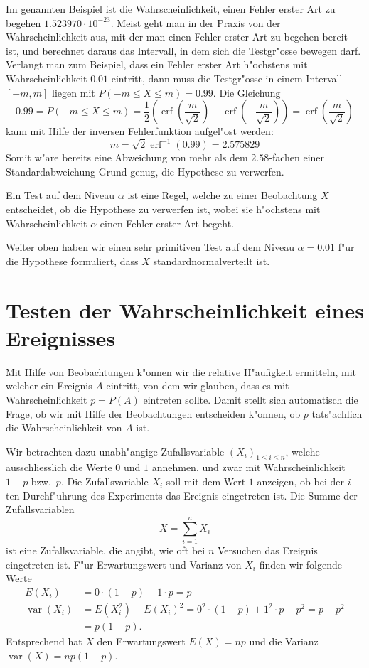 Im genannten Beispiel ist die Wahrscheinlichkeit, einen Fehler erster
Art zu begehen $1.523970\cdot 10^{-23}$.
Meist geht man in der Praxis von der
Wahrscheinlichkeit aus, mit der man einen Fehler erster Art zu begehen
bereit ist, und berechnet daraus das Intervall, in dem sich die
Testgr"osse bewegen darf.
Verlangt man zum Beispiel, dass ein Fehler erster
Art h"ochstens mit Wahrscheinlichkeit $0.01$ eintritt, dann muss die 
Testgr"osse in einem Intervall $[-m,m]$ liegen mit $P(-m\le X\le m)=0.99$.
Die Gleichung
\[
0.99 = P(-m\le X\le m)
=\frac12\left(\operatorname{erf}(\frac{m}{\sqrt{2}})-\operatorname{erf}(-\frac{m}{\sqrt{2}})\right)
=\operatorname{erf}(\frac{m}{\sqrt{2}})
\]
kann mit Hilfe der inversen Fehlerfunktion aufgel"ost werden:
\[
m=\sqrt{2}\operatorname{erf}^{-1}(0.99)=2.575829
\]
Somit w"are bereits eine Abweichung von mehr als dem $2.58$-fachen einer
Standardabweichung Grund genug, die Hypothese zu verwerfen.

\begin{definition}
Ein Test auf dem Niveau $\alpha$ ist eine Regel, welche zu einer
Beobachtung $X$ entscheidet, ob die Hypothese zu verwerfen ist, wobei
sie h"ochstens mit Wahrscheinlichkeit $\alpha$ einen Fehler erster
Art begeht.
\end{definition}

Weiter oben haben wir einen sehr primitiven Test auf dem Niveau
$\alpha=0.01$ f"ur die
Hypothese formuliert, dass $X$ standardnormalverteilt ist.

\section{Testen der Wahrscheinlichkeit eines Ereignisses}
Mit Hilfe von Beobachtungen k"onnen wir die relative H"aufigkeit ermitteln, mit
welcher ein Ereignis $A$ eintritt, von dem wir glauben, dass es mit
Wahrscheinlichkeit $p=P(A)$ eintreten sollte.
Damit stellt sich automatisch die Frage, ob wir mit Hilfe der
Beobachtungen entscheiden k"onnen, ob $p$ tats"achlich die Wahrscheinlichkeit
von $A$ ist.

Wir betrachten dazu unabh"angige Zufallsvariable $(X_i)_{1\le i\le n}$,
welche ausschliesslich
die Werte $0$ und $1$ annehmen, und zwar mit Wahrscheinlichkeit
$1-p$ bzw.~$p$.
Die Zufallsvariable $X_i$ soll mit dem Wert $1$ anzeigen,
ob bei der $i$-ten Durchf"uhrung des Experiments das Ereignis eingetreten ist.
Die Summe der Zufallsvariablen 
\[
X=\sum_{i=1}^nX_i
\]
ist eine Zufallsvariable, die angibt, wie oft bei $n$ Versuchen das Ereignis
eingetreten ist.
F"ur Erwartungswert und Varianz von $X_i$ finden
wir folgende Werte
\begin{align*}
E(X_i)
&=
0\cdot (1-p)+1\cdot p=p
\\
\operatorname{var}(X_i)
&=
E(X_i^2)-E(X_i)^2=0^2\cdot (1-p)+1^2\cdot p-p^2 =p-p^2
\\
&=
p(1-p).
\end{align*}
Entsprechend hat $X$ den Erwartungswert $E(X)=np$ und
die Varianz $\operatorname{var}(X)=np(1-p)$.

